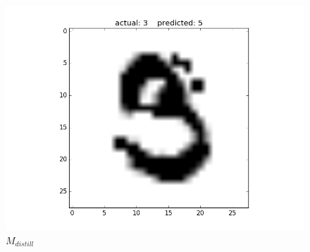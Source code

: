 \documentclass{article}
\begin{document}
\newpage
\begin{figure}[h!]
	\begin{minipage}{0.5\textwidth}
		\centering
		\includegraphics[width=\textwidth]{distill1.png}
		\caption{$M_{distill}$}
	\end{minipage}
\end{figure}
\end{document}
